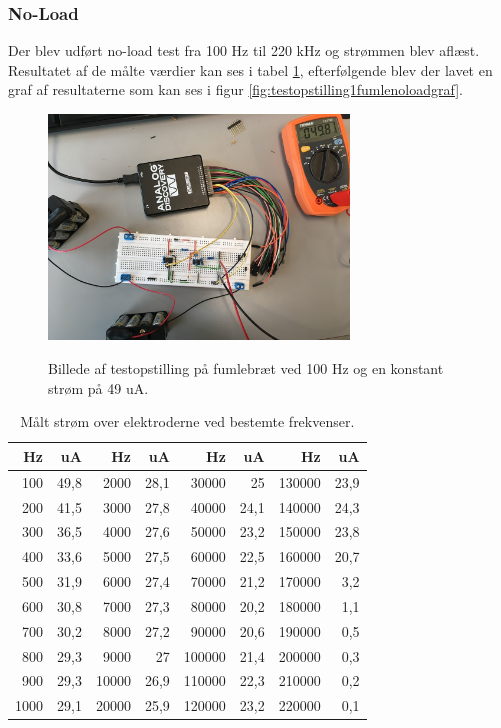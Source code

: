 \subsubsection{No-Load}
Der blev udført no-load test fra 100 Hz til 220 kHz og strømmen blev aflæst. Resultatet af de målte værdier kan ses i tabel \ref{table:frekvensernoload2}, efterfølgende blev der lavet en graf af resultaterne som kan ses i figur \ref{fig:testopstilling1fumlenoloadgraf}.


\begin{figure}[H]
\centering
{\includegraphics[width=8cm]
{Figure/oprindeligekredslobfumle1}}
\caption{Billede af testopstilling på fumlebræt ved 100 Hz og en konstant strøm på 49 uA.}
\label{fig:oprindeligekredslobfumle1}
\end{figure}





\begin{table}[H]
\centering
\begin{tabular}{| r | r || r | r || r | r || r | r |}
    \hline
    \textbf{Hz} & \textbf{uA} & \textbf{Hz} & \textbf{uA} & \textbf{Hz} & \textbf{uA} & \textbf{Hz} & \textbf{uA}\\ \hline
    100 & 49,8 & 2000 & 28,1 & 30000 & 25 & 130000 & 23,9  \\ \hline
    200 & 41,5 & 3000 & 27,8 & 40000 & 24,1 & 140000 & 24,3  \\ \hline
    300 & 36,5 & 4000 & 27,6 & 50000 & 23,2 & 150000 & 23,8  \\ \hline
    400 & 33,6 & 5000 & 27,5 & 60000 & 22,5 & 160000 & 20,7  \\ \hline
    500 & 31,9 & 6000 & 27,4 & 70000 & 21,2 & 170000 & 3,2  \\ \hline
    600 & 30,8 & 7000 & 27,3 & 80000 & 20,2 & 180000 & 1,1  \\ \hline
    700 & 30,2 & 8000 & 27,2 & 90000 & 20,6 & 190000 & 0,5  \\ \hline
    800 & 29,3 & 9000 & 27 & 100000 & 21,4 &  200000 & 0,3  \\ \hline
    900 & 29,3 & 10000 & 26,9 & 110000 & 22,3 &  210000 & 0,2   \\ \hline
    1000 & 29,1 & 20000 & 25,9 & 120000 & 23,2 &  220000 & 0,1  \\ \hline
\end{tabular}
    \caption{Målt strøm over elektroderne ved bestemte frekvenser.}
    \label{table:frekvensernoload2}
\end{table} 



